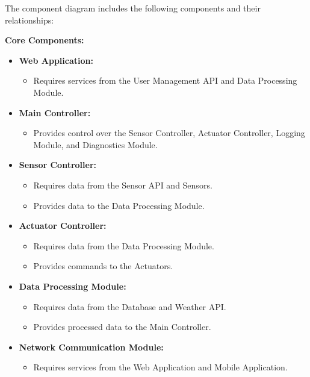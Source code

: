 The component diagram includes the following components and their relationships:

\textbf{Core Components:}
\begin{itemize}
    \item \textbf{Web Application:}
    \begin{itemize}
        \item Requires services from the User Management API and Data Processing Module.
    \end{itemize}

    \item \textbf{Main Controller:}
    \begin{itemize}
        \item Provides control over the Sensor Controller, Actuator Controller, Logging Module, and Diagnostics Module.
    \end{itemize}

    \item \textbf{Sensor Controller:}
    \begin{itemize}
        \item Requires data from the Sensor API and Sensors.
        \item Provides data to the Data Processing Module.
    \end{itemize}

    \item \textbf{Actuator Controller:}
    \begin{itemize}
        \item Requires data from the Data Processing Module.
        \item Provides commands to the Actuators.
    \end{itemize}

    \item \textbf{Data Processing Module:}
    \begin{itemize}
        \item Requires data from the Database and Weather API.
        \item Provides processed data to the Main Controller.
    \end{itemize}

    \item \textbf{Network Communication Module:}
    \begin{itemize}
        \item Requires services from the Web Application and Mobile Application.
    \end{itemize}
\end{itemize}


